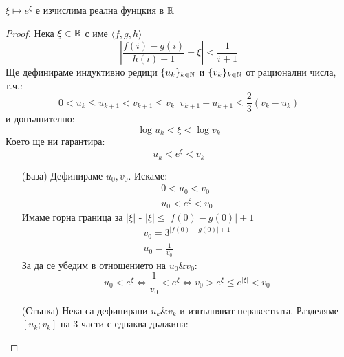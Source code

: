 \begin{theorem}[Експоненциране]
    $\xi \mapsto e^\xi$ е изчислима реална фунцкия в ${\mathbb{R}}$
\end{theorem}
\begin{proof}
    Нека $\xi \in {\mathbb{R}}$ с име $\langle f, g, h \rangle$
    \begin{equation}
        \left|\frac{f(i) - g(i)}{h(i) + 1} - \xi \right| < \frac{1}{i+1}
    \end{equation}
    Ще дефинираме индуктивно редици $\{u_k\}_{k \in {\mathbb{N}}}$ и $\{v_k\}_{k \in {\mathbb{N}}}$ от рационални числа, т.ч.:
    \begin{equation}
        0 < u_k \leq u_{k+1} < v_{k+1} \leq v_k\;\; v_{k+1} - u_{k+1} \leq \frac{2}{3}(v_k - u_k)
    \end{equation}
    и допълнително:
    \begin{equation}
        \log u_k < \xi < \log v_k
    \end{equation}
    Което ще ни гарантира:
    \begin{equation}
        u_k < e^\xi < v_k
    \end{equation}
    \begin{itemize}
        \item[(База)] Дефинираме $u_0, v_0$. Искаме:
        \begin{eqnarray}
            0 < u_0 < v_0\\
            u_0 < e^\xi < v_0
        \end{eqnarray}
        Имаме горна граница за $|\xi|$ - $|\xi| \leq |f(0) - g(0)| + 1$
        \begin{eqnarray}
            v_0 = 3^{|f(0) - g(0)| + 1}\\
            u_0 = \frac{1}{v_0}
        \end{eqnarray}
        За да се убедим в отношението на $u_0 \& v_0$:
        \begin{equation}
            u_0 < e^\xi \iff \frac{1}{v_0} < e^\xi \iff v_0 > e^\xi \leq e^{|\xi|} < v_0
        \end{equation}
        \item[(Стъпка)] Нека са дефинирани $u_k \& v_k$ и изпълняват неравествата. Разделяме $[u_k;v_k]$ на 3 части с еднаква дължина:
        

\end{itemize}
\end{proof}
